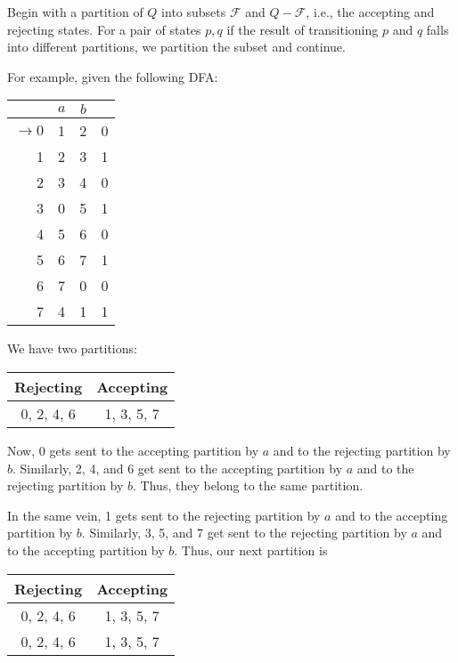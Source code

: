 Begin with a partition of $Q$ into subsets $\mathcal{F}$ and $Q-\mathcal{F}$, i.e., the accepting and rejecting states. For a pair of states $p, q$ if the result of transitioning $p$ and $q$ falls into different partitions, we partition the subset and continue.

For example, given the following DFA:

\begin{center}\begin{tabular}{r| c c r}
         & $a$ & $b$ & \\\hline
         $\to 0$ & 1 & 2 & 0\\
               1 & 2 & 3 & 1\\
               2 & 3 & 4 & 0\\
               3 & 0 & 5 & 1\\
               4 & 5 & 6 & 0\\
               5 & 6 & 7 & 1\\
               6 & 7 & 0 & 0\\
               7 & 4 & 1 & 1
    \end{tabular}\end{center}

We have two partitions:

\begin{center}\begin{tabular}{c|c|c|c|c|c|c|c}
\multicolumn{4}{c|}{Rejecting} & \multicolumn{4}{|c}{Accepting}\\\hline
\multicolumn{4}{c|}{0, 2, 4, 6} & \multicolumn{4}{|c}{1, 3, 5, 7}
\end{tabular}\end{center}

Now, 0 gets sent to the accepting partition by $a$ and to the rejecting partition by $b$. Similarly, 2, 4, and 6 get sent to the accepting partition by $a$ and to the rejecting partition by $b$. Thus, they belong to the same partition.

In the same vein, 1 gets sent to the rejecting partition by $a$ and to the accepting partition by $b$. Similarly, 3, 5, and 7 get sent to the rejecting partition by $a$ and to the accepting partition by $b$. Thus, our next partition is

\begin{center}\begin{tabular}{|c|c|c|c|c|c|c|c|}
\multicolumn{4}{|c|}{Rejecting} & \multicolumn{4}{|c|}{Accepting}\\\hline
\multicolumn{4}{|c|}{0, 2, 4, 6} & \multicolumn{4}{|c|}{1, 3, 5, 7}\\
\multicolumn{4}{|c|}{0, 2, 4, 6} & \multicolumn{4}{|c|}{1, 3, 5, 7}
\end{tabular}\end{center}

